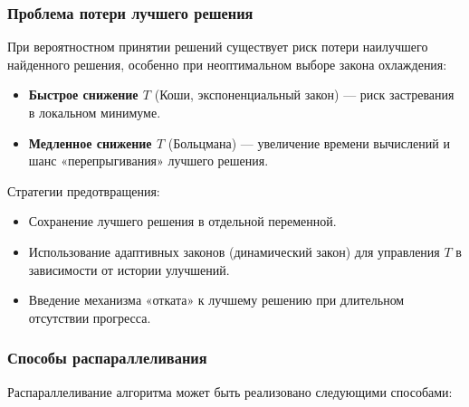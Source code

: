 \subsubsection*{Проблема потери лучшего решения}
При вероятностном принятии решений существует риск потери наилучшего найденного решения, особенно при неоптимальном выборе закона охлаждения:
\begin{itemize}
    \item \textbf{Быстрое снижение $T$} (Коши, экспоненциальный закон) — риск застревания в локальном минимуме.
    \item \textbf{Медленное снижение $T$} (Больцмана) — увеличение времени вычислений и шанс «перепрыгивания» лучшего решения.
\end{itemize}
Стратегии предотвращения:
\begin{itemize}
    \item Сохранение лучшего решения в отдельной переменной.
    \item Использование адаптивных законов (динамический закон) для управления $T$ в зависимости от истории улучшений.
    \item Введение механизма «отката» к лучшему решению при длительном отсутствии прогресса.
\end{itemize}

\subsubsection*{Способы распараллеливания}
Распараллеливание алгоритма может быть реализовано следующими способами:

